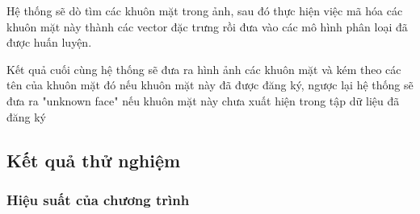 Hệ thống sẽ dò tìm các khuôn mặt trong ảnh, sau đó thực hiện việc mã hóa các khuôn mặt này thành các vector đặc trưng
rồi đưa vào các mô hình phân loại đã được huấn luyện. 

Kết quả cuối cùng hệ thống sẽ đưa ra hình ảnh các khuôn mặt và kém theo các tên của khuôn mặt đó
nếu khuôn mặt này đã được đăng ký, ngược lại hệ thống sẽ đưa ra "unknown face" nếu khuôn mặt này
chưa xuất hiện trong tập dữ liệu đã đăng ký 

\subsection{Kết quả thử nghiệm}
\subsubsection{Hiệu suất của chương trình}


